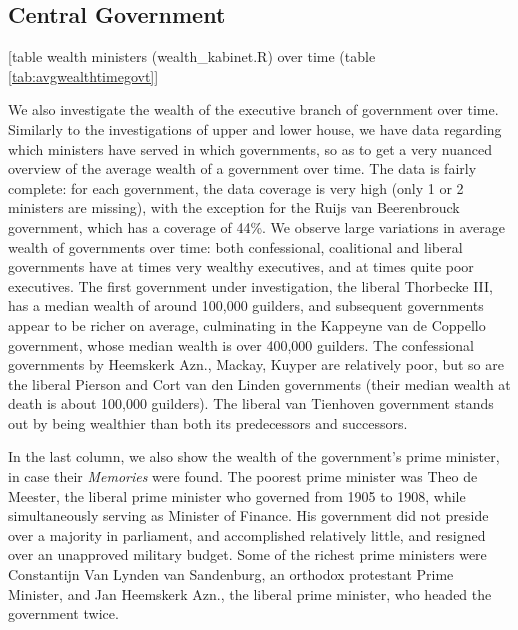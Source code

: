 \subsection{Central Government}
\begin{center}
    [table wealth ministers (wealth\_kabinet.R) over time (table \ref{tab:avgwealthtimegovt}]
 \end{center}   
    We also investigate the wealth of the executive branch of government over time. Similarly to the investigations of upper and lower house, we have data regarding which ministers have served in which governments, so as to get a very nuanced overview of the average wealth of a government over time. The data is fairly complete: for each government, the data coverage is very high (only 1 or 2 ministers are missing), with the exception for the Ruijs van Beerenbrouck government, which has a coverage of 44\%. We observe large variations in average wealth of governments over time: both confessional, coalitional and liberal governments have at times very wealthy executives, and at times quite poor executives. The first government under investigation, the liberal Thorbecke III, has a median wealth of around 100,000 guilders, and subsequent governments appear to be richer on average, culminating in the Kappeyne van de Coppello government, whose median wealth is over 400,000 guilders. The confessional governments by Heemskerk Azn., Mackay, Kuyper are relatively poor, but so are the liberal Pierson and Cort van den Linden governments (their median wealth at death is about 100,000 guilders). The liberal van Tienhoven government stands out by being wealthier than both its predecessors and successors. 
    
    In the last column, we also show the wealth of the government's prime minister, in case their \textit{Memories} were found. The poorest prime minister was Theo de Meester, the liberal prime minister  who governed from 1905 to 1908, while simultaneously serving as Minister of Finance. His government did not preside over a majority in parliament, and accomplished relatively little, and resigned over an unapproved military budget. Some of the richest prime ministers were Constantijn Van Lynden van Sandenburg, an orthodox protestant Prime Minister, and Jan Heemskerk Azn., the liberal prime minister, who headed the government twice. 
    
